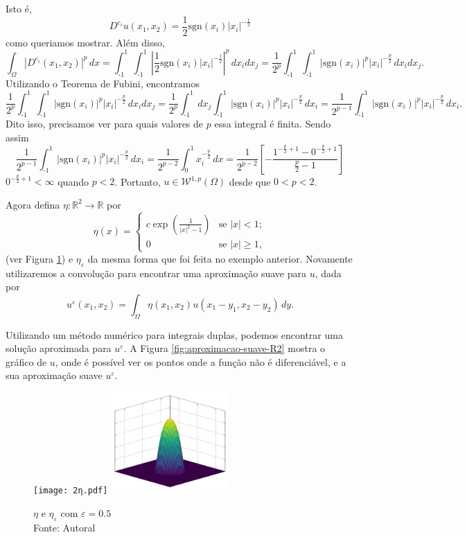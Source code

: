 \documentclass[a4paper, 11pt]{book}
\theoremstyle{definition}
\newcommand{\bR}{\mathbb{R}}
\newcommand{\cW}{\mathcal{W}}
\newcommand{\sgn}{\mathrm{sgn}}
\begin{document}
\begin{ex}
\[    \]
    Isto é,
    \[
        D^{e_i} u(x_1,x_2) = \frac{1}{2}\sgn(x_i) |x_i|^{-\frac{1}{2}}
    \]
    como queriamos mostrar.
    Além disso,
    \[
        \int_\Omega |D^{e_i} (x_1,x_2)|^p \, dx = \int_{\text{-}1}^1 \int_{\text{-}1}^1 \left| \frac{1}{2} \sgn(x_i) |x_i|^{-\frac{1}{2}} \right|^p \, dx_i dx_j = \frac{1}{2^p}\int_{\text{-}1}^1 \int_{\text{-}1}^1 |\sgn(x_i)|^p |x_i|^{-\frac{p}{2}} \,dx_i dx_j.
    \]
    Utilizando o Teorema de Fubini, encontramos
    {\small
    \[
        \frac{1}{2^p}\int_{\text{-}1}^1\int_{\text{-}1}^1 |\sgn(x_i)|^p |x_i|^{-\frac{p}{2}} \,dx_i dx_j = \frac{1}{2^p}\int_{\text{-}1}^1 dx_j \int_{\text{-}1}^1 |\sgn(x_i)|^p |x_i|^{-\frac{p}{2}} \,dx_i = \frac{1}{2^{p-1}} \int_{\text{-}1}^1 |\sgn(x_i)|^p |x_i|^{-\frac{p}{2}} \,dx_i.
    \]}\!
    Dito isso, precisamos ver para quais valores de $p$ essa integral é finita. Sendo assim
    \[
        \frac{1}{2^{p-1}} \int_{\text{-}1}^1 |\sgn(x_i)|^p |x_i|^{-\frac{p}{2}} \,dx_i = \frac{1}{2^{p-2}}\int_0^1 x_i^{-\frac{p}{2}} \,dx = \frac{1}{2^{p-2}} \left[ -\frac{1^{-\frac{p}{2}+1} - 0^{-\frac{p}{2}+1}}{\tfrac{p}{2} - 1} \right]
    \]
    $0^{-\frac{p}{2} + 1} < \infty$ quando $p < 2$. Portanto, $u \in \cW^{1,p}(\Omega)$ desde que $0 < p < 2$.

    Agora defina $\eta: \bR^2 \to \bR$ por
    \[
        \eta(x) = 
        \left\{ 
            \begin{array}{lr}
                c \exp\left(\frac{1}{|x|^2 - 1} \right) & \text{se } |x| < 1;\\
                0 & \text{se } |x| \geqslant 1,
            \end{array}
        \right.
    \]
    (ver Figura \ref{fig:eta-R2}) e $\eta_\varepsilon$ da mesma forma que foi feita no exemplo anterior. Novamente utilizaremos a convolução para encontrar uma aproximação suave para $u$, dada por
    \[
        u^{\varepsilon}(x_1,x_2) = \int_\Omega \eta(x_1,x_2) u(x_1 - y_1, x_2 - y_2) \,dy.
    \]

    Utilizando um método numérico para integrais duplas, podemos encontrar uma solução aproximada para $u^\varepsilon$.
    A Figura \ref{fig:aproximacao-suave-R2} mostra o gráfico de $u$, onde é possível ver os pontos onde a função não é diferenciável, e a sua aproximação suave $u^\varepsilon$.

    \begin{figure}
        \centering
        \texttt{[image: 2η.pdf]}
        \hspace{10mm}
        \includegraphics[width=0.4\textwidth]{2ηε.pdf}
        \caption{$\eta$ e $\eta_\varepsilon$ com $\varepsilon = 0.5$\\Fonte: Autoral}
        \label{fig:eta-R2}
    \end{figure}


\end{ex}
\end{document}
